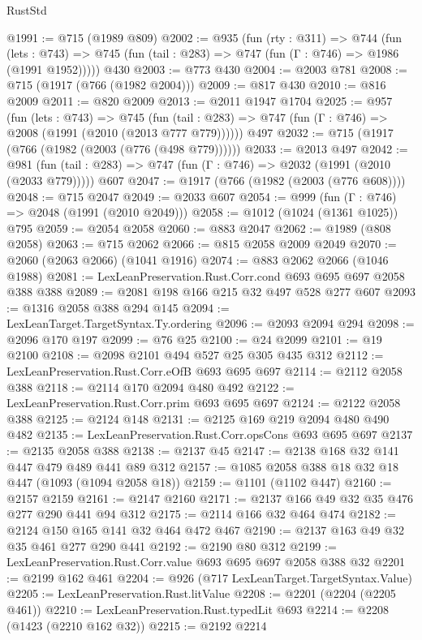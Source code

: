 \begin{lexlean}{RustStd}
\begin{coremodule}
{\begin{coremodule}
{{{{{{{{@1991 := @715 (@1989 @809)
@2002 := @935
    (fun (rty : @311) =>
    @744
      (fun (lets : @743) =>
      @745 (fun (tail : @283) => @747 (fun (Γ : @746) => @1986 (@1991 @1952)))))
    @430
@2003 := @773 @430
@2004 := @2003 @781
@2008 := @715 (@1917 (@766 (@1982 @2004)))
@2009 := @817 @430
@2010 := @816 @2009
@2011 := @820 @2009
@2013 := @2011 @1947 @1704
@2025 := @957
    (fun (lets : @743) =>
    @745 (fun (tail : @283) => @747 (fun (Γ : @746) => @2008 (@1991 (@2010 (@2013 @777 @779))))))
    @497
@2032 := @715 (@1917 (@766 (@1982 (@2003 (@776 (@498 @779))))))
@2033 := @2013 @497
@2042 := @981
    (fun (tail : @283) => @747 (fun (Γ : @746) => @2032 (@1991 (@2010 (@2033 @779)))))
    @607
@2047 := @1917 (@766 (@1982 (@2003 (@776 @608))))
@2048 := @715 @2047
@2049 := @2033 @607
@2054 := @999 (fun (Γ : @746) => @2048 (@1991 (@2010 @2049)))
@2058 := @1012 (@1024 (@1361 @1025)) @795
@2059 := @2054 @2058
@2060 := @883 @2047
@2062 := @1989 (@808 @2058)
@2063 := @715 @2062
@2066 := @815 @2058 @2009 @2049
@2070 := @2060 (@2063 @2066) (@1041 @1916)
@2074 := @883 @2062 @2066 (@1046 @1988)
@2081 := LexLeanPreservation.Rust.Corr.cond @693 @695 @697 @2058 @388 @388
@2089 := @2081 @198 @166 @215 @32 @497 @528 @277 @607
@2093 := @1316 @2058 @388 @294 @145
@2094 := LexLeanTarget.TargetSyntax.Ty.ordering
@2096 := @2093 @2094 @294
@2098 := @2096 @170 @197
@2099 := @76 @25
@2100 := @24 @2099
@2101 := @19 @2100
@2108 := @2098 @2101 @494 @527 @25 @305 @435 @312
@2112 := LexLeanPreservation.Rust.Corr.eOfB @693 @695 @697
@2114 := @2112 @2058 @388
@2118 := @2114 @170 @2094 @480 @492
@2122 := LexLeanPreservation.Rust.Corr.prim @693 @695 @697
@2124 := @2122 @2058 @388
@2125 := @2124 @148
@2131 := @2125 @169 @219 @2094 @480 @490 @482
@2135 := LexLeanPreservation.Rust.Corr.opsCons @693 @695 @697
@2137 := @2135 @2058 @388
@2138 := @2137 @45
@2147 := @2138 @168 @32 @141 @447 @479 @489 @441 @89 @312
@2157 := @1085 @2058 @388 @18 @32 @18 @447 (@1093 (@1094 @2058 @18))
@2159 := @1101 (@1102 @447)
@2160 := @2157 @2159
@2161 := @2147 @2160
@2171 := @2137 @166 @49 @32 @35 @476 @277 @290 @441 @94 @312
@2175 := @2114 @166 @32 @464 @474
@2182 := @2124 @150 @165 @141 @32 @464 @472 @467
@2190 := @2137 @163 @49 @32 @35 @461 @277 @290 @441
@2192 := @2190 @80 @312
@2199 := LexLeanPreservation.Rust.Corr.value @693 @695 @697 @2058 @388 @32
@2201 := @2199 @162 @461
@2204 := @926 (@717 LexLeanTarget.TargetSyntax.Value)
@2205 := LexLeanPreservation.Rust.litValue
@2208 := @2201 (@2204 (@2205 @461))
@2210 := LexLeanPreservation.Rust.typedLit @693
@2214 := @2208 (@1423 (@2210 @162 @32))
@2215 := @2192 @2214
}}}}}}}}
\end{coremodule}}
\end{coremodule}
\end{lexlean}

